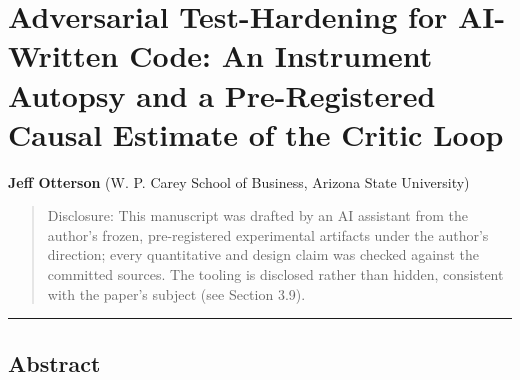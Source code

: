 \documentclass[
  11pt,
]{article}
\author{}
\date{}
\begin{document}
\section{Adversarial Test-Hardening for AI-Written Code: An Instrument
Autopsy and a Pre-Registered Causal Estimate of the Critic
Loop}\label{adversarial-test-hardening-for-ai-written-code-an-instrument-autopsy-and-a-pre-registered-causal-estimate-of-the-critic-loop}

\textbf{Jeff Otterson} (W. P. Carey School of Business, Arizona State
University)

\begin{quote}
Disclosure: This manuscript was drafted by an AI assistant from the
author's frozen, pre-registered experimental artifacts under the
author's direction; every quantitative and design claim was checked
against the committed sources. The tooling is disclosed rather than
hidden, consistent with the paper's subject (see Section 3.9).
\end{quote}

\begin{center}\rule{0.5\linewidth}{0.5pt}\end{center}

\subsection{Abstract}\label{abstract}
\end{document}
